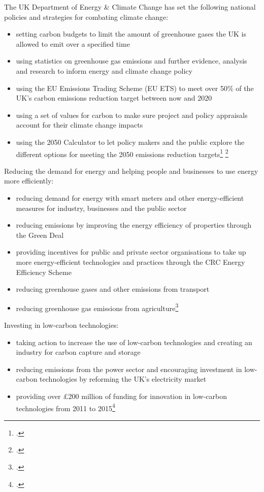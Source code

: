 The UK Department of Energy \& Climate Change has set the following national policies and strategies for combating climate change:
\begin{itemize}
	\item setting carbon budgets to limit the amount of greenhouse gases the UK is allowed to emit over a specified time
	\item using statistics on greenhouse gas emissions and further evidence, analysis and research to inform energy and climate change policy
	\item using the EU Emissions Trading Scheme (EU ETS) to meet over 50\% of the UK's carbon emissions reduction target between now and 2020
	\item using a set of values for carbon to make sure project and policy appraisals account for their climate change impacts
	\item using the 2050 Calculator to let policy makers and the public explore the different options for meeting the 2050 emissions reduction targets\footcite[][]{UKgovnt} \footcite[][]{EUETS}
\end{itemize}



Reducing the demand for energy and helping people and businesses to use energy more efficiently:
\begin{itemize}
	\item reducing demand for energy with smart meters and other energy-efficient measures for industry, businesses and the public sector
	\item reducing emissions by improving the energy efficiency of properties through the Green Deal
	\item providing incentives for public and private sector organisations to take up more energy-efficient technologies and practices through the CRC Energy Efficiency Scheme 
	\item reducing greenhouse gases and other emissions from transport
	\item reducing greenhouse gas emissions from agriculture\footcite[][]{UKgovnt}
\end{itemize}



Investing in low-carbon technologies:
\begin{itemize}
	\item taking action to increase the use of low-carbon technologies and creating an industry for carbon capture and storage
	\item reducing emissions from the power sector and encouraging investment in low-carbon technologies by reforming the UK’s electricity market
	\item providing over £200 million of funding for innovation in low-carbon technologies from 2011 to 2015\footcite[][]{UKgovnt}
\end{itemize}



